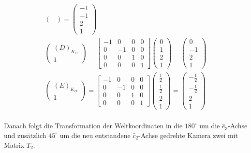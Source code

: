 \begin{gather}
\begin{pmatrix}
	\end{pmatrix}
	=
	\begin{pmatrix}
		-1\\-1\\2\\1
	\end{pmatrix}\\
	\begin{pmatrix}
		(D)_{K_{c1}}\\1
	\end{pmatrix}
	=
	\begin{bmatrix}
		-1&0&0&0\\
		0&-1&0&0\\
		0&0&1&0\\
		0&0&0&1
	\end{bmatrix}
	\begin{pmatrix}
		0\\1\\2\\1
	\end{pmatrix}
	=
	\begin{pmatrix}
		0\\-1\\2\\1
	\end{pmatrix}\\
	\begin{pmatrix}
	(E)_{K_{c1}}\\1
\end{pmatrix}
=
\begin{bmatrix}
	-1&0&0&0\\
	0&-1&0&0\\
	0&0&1&0\\
	0&0&0&1
\end{bmatrix}
\begin{pmatrix}
	\frac{1}{2}\\\frac{1}{2}\\2\\1
\end{pmatrix}
=
\begin{pmatrix}
	-\frac{1}{2}\\-\frac{1}{2}\\2\\1
\end{pmatrix}\\
\end{gather}

Danach folgt die Transformation der Weltkoordinaten in die \ensuremath{180^\circ} um die \ensuremath{\hat{e}_3}-Achse und zusätzlich \ensuremath{45^\circ} um die neu entstandene \ensuremath{\hat{c}_2}-Achse gedrehte Kamera zwei mit Matrix \ensuremath{T_2}.

